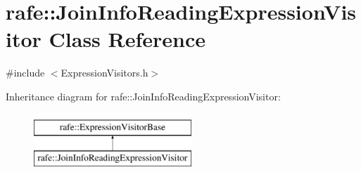 \hypertarget{classrafe_1_1_join_info_reading_expression_visitor}{\section{rafe\+:\+:Join\+Info\+Reading\+Expression\+Visitor Class Reference}
\label{classrafe_1_1_join_info_reading_expression_visitor}
}


{\ttfamily \#include $<$Expression\+Visitors.\+h$>$}

Inheritance diagram for rafe\+:\+:Join\+Info\+Reading\+Expression\+Visitor\+:\begin{figure}[H]
\begin{center}
\leavevmode
\includegraphics[height=2.000000cm]{classrafe_1_1_join_info_reading_expression_visitor}
\end{center}
\end{figure}
